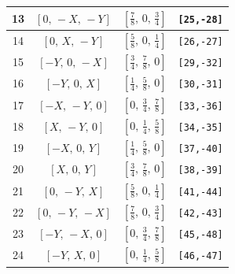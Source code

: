\documentclass[fleqn,8pt]{jsarticle}
\begin{document}
\begin{longtable}{cccc}
13 & $\left[ 0,\, - X,\, - Y \right]$ & $\left[ \frac{7}{8},\, 0,\, \frac{3}{4} \right]$ & {\tt [25,-28]} \\ \hline
14 & $\left[ 0,\, X,\, - Y \right]$ & $\left[ \frac{5}{8},\, 0,\, \frac{1}{4} \right]$ & {\tt [26,-27]} \\ \hline
15 & $\left[ - Y,\, 0,\, - X \right]$ & $\left[ \frac{3}{4},\, \frac{7}{8},\, 0 \right]$ & {\tt [29,-32]} \\ \hline
16 & $\left[ - Y,\, 0,\, X \right]$ & $\left[ \frac{1}{4},\, \frac{5}{8},\, 0 \right]$ & {\tt [30,-31]} \\ \hline
17 & $\left[ - X,\, - Y,\, 0 \right]$ & $\left[ 0,\, \frac{3}{4},\, \frac{7}{8} \right]$ & {\tt [33,-36]} \\ \hline
18 & $\left[ X,\, - Y,\, 0 \right]$ & $\left[ 0,\, \frac{1}{4},\, \frac{5}{8} \right]$ & {\tt [34,-35]} \\ \hline
19 & $\left[ - X,\, 0,\, Y \right]$ & $\left[ \frac{1}{4},\, \frac{5}{8},\, 0 \right]$ & {\tt [37,-40]} \\ \hline
20 & $\left[ X,\, 0,\, Y \right]$ & $\left[ \frac{3}{4},\, \frac{7}{8},\, 0 \right]$ & {\tt [38,-39]} \\ \hline
21 & $\left[ 0,\, - Y,\, X \right]$ & $\left[ \frac{5}{8},\, 0,\, \frac{1}{4} \right]$ & {\tt [41,-44]} \\ \hline
22 & $\left[ 0,\, - Y,\, - X \right]$ & $\left[ \frac{7}{8},\, 0,\, \frac{3}{4} \right]$ & {\tt [42,-43]} \\ \hline
23 & $\left[ - Y,\, - X,\, 0 \right]$ & $\left[ 0,\, \frac{3}{4},\, \frac{7}{8} \right]$ & {\tt [45,-48]} \\ \hline
24 & $\left[ - Y,\, X,\, 0 \right]$ & $\left[ 0,\, \frac{1}{4},\, \frac{5}{8} \right]$ & {\tt [46,-47]} \\
\end{longtable}
\renewcommand{\arraystretch}{1.2}
\end{document}
